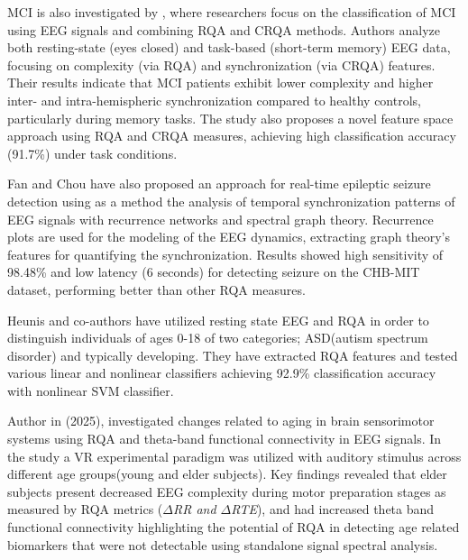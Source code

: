 \documentclass{article}
\begin{document}
			MCI is also investigated by \cite{timothy2017classification}, where 
			researchers focus on 
			the classification of MCI using EEG signals and 
			combining RQA and CRQA methods. Authors analyze both resting-state 
			(eyes closed) and task-based (short-term memory) EEG data, 
			focusing on complexity (via RQA) and synchronization (via CRQA) features. 
			Their results indicate that MCI patients exhibit lower complexity
			and higher inter- and intra-hemispheric synchronization compared to healthy controls, 
			particularly during memory tasks. 
			The study also proposes a novel feature space approach using RQA and CRQA measures, 
			achieving high classification accuracy (91.7\%) under task conditions. 
				


			Fan and Chou \cite{fan2019detecting} have also proposed 
			an approach for real-time epileptic seizure detection
			using as a method the analysis of temporal synchronization 
			patterns of EEG signals with recurrence networks and spectral graph theory. 
			Recurrence plots are used for the modeling of the EEG dynamics, 
			extracting graph theory's features for quantifying the synchronization. 
			Results showed high sensitivity of 98.48\% and low latency
			(6 seconds) for detecting seizure on the CHB-MIT dataset, 
			performing better than other RQA measures.  

			Heunis and co-authors\cite{heunis2018} have utilized resting state EEG and RQA in order to
			distinguish individuals of ages 0-18 of two categories; ASD(autism spectrum disorder) and typically developing.
			They have extracted RQA features and tested various linear and nonlinear classifiers achieving 92.9\% classification
			accuracy with nonlinear SVM classifier.

			Author in \cite{pitsik}(2025), investigated changes related to aging in 
			brain sensorimotor systems using 
			RQA and theta-band functional connectivity in EEG signals. 
			In the study a VR experimental paradigm was 
			utilized with auditory stimulus across different age groups(young and elder subjects). 
			Key findings revealed that elder subjects present 
			decreased EEG complexity during motor preparation stages as 
			measured by RQA metrics (\textit{$\Delta$RR and $\Delta$RTE}), 
			and had increased theta band functional connectivity 
			highlighting the potential of RQA in detecting 
			age related biomarkers that were not detectable using 
			standalone signal spectral analysis.
\end{document}
